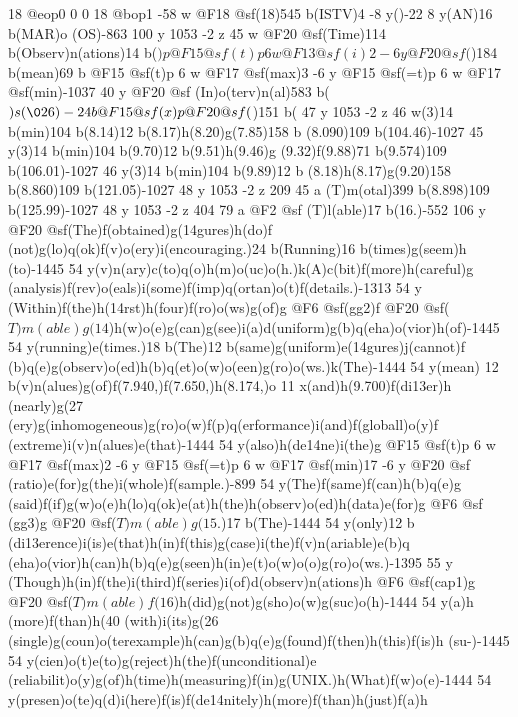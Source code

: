 {{{{{{{{{{{{{{{{{{{{{{{{{{{{{{{{{{{{{{{{{{{{{{{{{{{{{{{{{{{{{{{{{{{{{{{{{{{{{{{{{{{{{{{{{{{{{{{{{{{{{18 @eop0
0 0 18 @bop1 -58 w @F18 @sf(18)545 b(ISTV)4 -8 y()-22 8 y(AN)16 b(MAR)o
(OS)-863 100 y 1053 -2 z 45 w @F20 @sf(Time)114 b(Observ)n(ations)14 b(\()p 
@F15 @sf(t)p 6 w @F13 @sf(i)2 -6 y @F20 @sf(\))184 b(mean)69 b @F15 @sf(t)p 
6 w @F17 @sf(max)3 -6 y @F15 @sf(=t)p 6 w @F17 @sf(min)-1037 40 y @F20 @sf
(In)o(terv)n(al)583 b(\()s(\026)-24 b @F15 @sf(x)p @F20 @sf(\))151 b(%
47 y 1053 -2 z 46 w(3)14 b(min)104 b(8.14)12 b(8.17)h(8.20)g(7.85)158 b
(8.090)109 b(104.46)-1027 45 y(3)14 b(min)104 b(9.70)12 b(9.51)h(9.46)g
(9.32)f(9.88)71 b(9.574)109 b(106.01)-1027 46 y(3)14 b(min)104 b(9.89)12 b
(8.18)h(8.17)g(9.20)158 b(8.860)109 b(121.05)-1027 48 y 1053 -2 z 209 45 a
(T)m(otal)399 b(8.898)109 b(125.99)-1027 48 y 1053 -2 z 404 79 a @F2 @sf
(T)l(able)17 b(16.)-552 106 y @F20 @sf(The)f(obtained)g(\014gures)h(do)f
(not)g(lo)q(ok)f(v)o(ery)i(encouraging.)24 b(Running)16 b(times)g(seem)h
(to)-1445 54 y(v)n(ary)c(to)q(o)h(m)o(uc)o(h.)k(A)c(bit)f(more)h(careful)g
(analysis)f(rev)o(eals)i(some)f(imp)q(ortan)o(t)f(details.)-1313 54 y
(Within)f(the)h(\014rst)h(four)f(ro)o(ws)g(of)g @F6 @sf(gg2)f @F20 @sf(\(T)m
(able)g(14\))h(w)o(e)g(can)g(see)i(a)d(uniform)g(b)q(eha)o(vior)h(of)-1445 
54 y(running)e(times.)18 b(The)12 b(same)g(uniform)e(\014gures)j(cannot)f
(b)q(e)g(observ)o(ed)h(b)q(et)o(w)o(een)g(ro)o(ws.)k(The)-1444 54 y(mean)
12 b(v)n(alues)g(of)f(7.940,)f(7.650,)h(8.174,)o 11 x(and)h(9.700)f(di\013er)h
(nearly)g(27%
(ery)g(inhomogeneous)g(ro)o(w)f(p)q(erformance)i(and)f(globall)o(y)f
(extreme)i(v)n(alues)e(that)-1444 54 y(also)h(de\014ne)i(the)g @F15 @sf(t)p 
6 w @F17 @sf(max)2 -6 y @F15 @sf(=t)p 6 w @F17 @sf(min)17 -6 y @F20 @sf
(ratio)e(for)g(the)i(whole)f(sample.)-899 54 y(The)f(same)f(can)h(b)q(e)g
(said)f(if)g(w)o(e)h(lo)q(ok)e(at)h(the)h(observ)o(ed)h(data)e(for)g @F6 @sf
(gg3)g @F20 @sf(\(T)m(able)g(15\).)17 b(The)-1444 54 y(only)12 b
(di\013erence)i(is)e(that)h(in)f(this)g(case)i(the)f(v)n(ariable)e(b)q
(eha)o(vior)h(can)h(b)q(e)g(seen)h(in)e(t)o(w)o(o)g(ro)o(ws.)-1395 55 y
(Though)h(in)f(the)i(third)f(series)i(of)d(observ)n(ations)h @F6 @sf(cap1)g 
@F20 @sf(\(T)m(able)f(16\))h(did)g(not)g(sho)o(w)g(suc)o(h)-1444 54 y(a)h
(more)f(than)h(40%
(with)i(its)g(26%
(single)g(coun)o(terexample)h(can)g(b)q(e)g(found)f(then)h(this)f(is)h
(su-)-1445 54 y(cien)o(t)e(to)g(reject)h(the)f(unconditional)e
(reliabilit)o(y)g(of)h(time)h(measuring)f(in)g(UNIX.)h(What)f(w)o(e)-1444 
54 y(presen)o(te)q(d)i(here)f(is)f(de\014nitely)h(more)f(than)h(just)f(a)h
}}}}}}}}}}}}}}}}}}}}}}}}}}}}}}}}}}}}}}}}}}}}}}}}}}}}}}}}}}}}}}}}}}}}}}}}}}}}}}}}}}}}}}}}}}}}}}}}}}}}}
